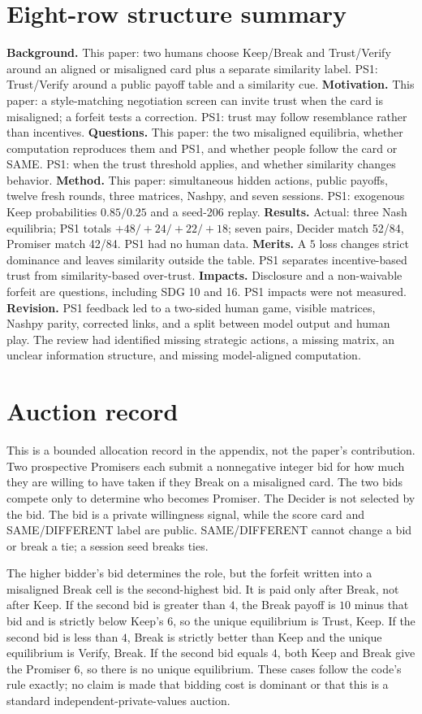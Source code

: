 \section{Eight-row structure summary}
\textbf{Background.} This paper: two humans choose Keep/Break and Trust/Verify around an aligned or misaligned card plus a separate similarity label. PS1: Trust/Verify around a public payoff table and a similarity cue. \textbf{Motivation.} This paper: a style-matching negotiation screen can invite trust when the card is misaligned; a forfeit tests a correction. PS1: trust may follow resemblance rather than incentives. \textbf{Questions.} This paper: the two misaligned equilibria, whether computation reproduces them and PS1, and whether people follow the card or SAME. PS1: when the trust threshold applies, and whether similarity changes behavior. \textbf{Method.} This paper: simultaneous hidden actions, public payoffs, twelve fresh rounds, three matrices, Nashpy, and seven sessions. PS1: exogenous Keep probabilities $0.85/0.25$ and a seed-206 replay. \textbf{Results.} Actual: three Nash equilibria; PS1 totals $+48/+24/+22/+18$; seven pairs, Decider match 52/84, Promiser match 42/84. PS1 had no human data. \textbf{Merits.} A $5$ loss changes strict dominance and leaves similarity outside the table. PS1 separates incentive-based trust from similarity-based over-trust. \textbf{Impacts.} Disclosure and a non-waivable forfeit are questions, including SDG 10 and 16. PS1 impacts were not measured. \textbf{Revision.} PS1 feedback led to a two-sided human game, visible matrices, Nashpy parity, corrected links, and a split between model output and human play. The review had identified missing strategic actions, a missing matrix, an unclear information structure, and missing model-aligned computation.

\section{Auction record}
This is a bounded allocation record in the appendix, not the paper's contribution. Two prospective Promisers each submit a nonnegative integer bid for how much they are willing to have taken if they Break on a misaligned card. The two bids compete only to determine who becomes Promiser. The Decider is not selected by the bid. The bid is a private willingness signal, while the score card and SAME/DIFFERENT label are public. SAME/DIFFERENT cannot change a bid or break a tie; a session seed breaks ties.

The higher bidder's bid determines the role, but the forfeit written into a misaligned Break cell is the second-highest bid. It is paid only after Break, not after Keep. If the second bid is greater than $4$, the Break payoff is $10$ minus that bid and is strictly below Keep's $6$, so the unique equilibrium is Trust, Keep. If the second bid is less than $4$, Break is strictly better than Keep and the unique equilibrium is Verify, Break. If the second bid equals $4$, both Keep and Break give the Promiser $6$, so there is no unique equilibrium. These cases follow the code's rule exactly; no claim is made that bidding cost is dominant or that this is a standard independent-private-values auction.

